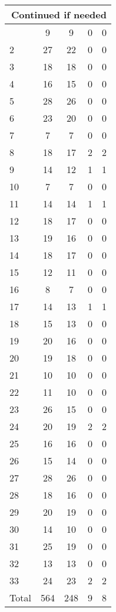 \begin{center}
\begin{longtable}{l|c|c|c|c}
\hline \multicolumn{5}{|r|}{{Continued if needed}} \\ \hline
\endfoot 
1 & 9 & 9 & 0 & 0\\ \hline
2 & 27 & 22 & 0 & 0\\ \hline
3 & 18 & 18 & 0 & 0\\ \hline
4 & 16 & 15 & 0 & 0\\ \hline
5 & 28 & 26 & 0 & 0\\ \hline
6 & 23 & 20 & 0 & 0\\ \hline
7 & 7 & 7 & 0 & 0\\ \hline
8 & 18 & 17 & 2 & 2\\ \hline
9 & 14 & 12 & 1 & 1\\ \hline
10 & 7 & 7 & 0 & 0\\ \hline
11 & 14 & 14 & 1 & 1\\ \hline
12 & 18 & 17 & 0 & 0\\ \hline
13 & 19 & 16 & 0 & 0\\ \hline
14 & 18 & 17 & 0 & 0\\ \hline
15 & 12 & 11 & 0 & 0\\ \hline
16 & 8 & 7 & 0 & 0\\ \hline
17 & 14 & 13 & 1 & 1\\ \hline
18 & 15 & 13 & 0 & 0\\ \hline
19 & 20 & 16 & 0 & 0\\ \hline
20 & 19 & 18 & 0 & 0\\ \hline
21 & 10 & 10 & 0 & 0\\ \hline
22 & 11 & 10 & 0 & 0\\ \hline
23 & 26 & 15 & 0 & 0\\ \hline
24 & 20 & 19 & 2 & 2\\ \hline
25 & 16 & 16 & 0 & 0\\ \hline
26 & 15 & 14 & 0 & 0\\ \hline
27 & 28 & 26 & 0 & 0\\ \hline
28 & 18 & 16 & 0 & 0\\ \hline
29 & 20 & 19 & 0 & 0\\ \hline
30 & 14 & 10 & 0 & 0\\ \hline
31 & 25 & 19 & 0 & 0\\ \hline
32 & 13 & 13 & 0 & 0\\ \hline
33 & 24 & 23 & 2 & 2\\ \hline
\hline \hline
Total & 564 & 248 & 9 & 8




\end{longtable}
\end{center}

